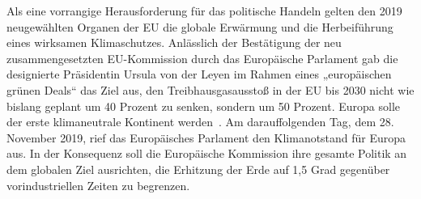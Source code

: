 Als eine vorrangige Herausforderung für das politische Handeln gelten den 2019 neugewählten Organen der EU die globale Erwärmung und die Herbeiführung eines wirksamen Klimaschutzes. Anlässlich der Bestätigung der neu zusammengesetzten EU-Kommission durch das Europäische Parlament gab die designierte Präsidentin Ursula von der Leyen im Rahmen eines „europäischen grünen Deals“ das Ziel aus, den Treibhausgasausstoß in der EU bis 2030 nicht wie bislang geplant um 40 Prozent zu senken, sondern um 50 Prozent. Europa solle der erste klimaneutrale Kontinent werden~\cite{tagesSpiegelEUKrise}. Am darauffolgenden Tag, dem 28. November 2019, rief das Europäisches Parlament den Klimanotstand für Europa aus. In der Konsequenz soll die Europäische Kommission ihre gesamte Politik an dem globalen Ziel ausrichten, die Erhitzung der Erde auf 1,5 Grad gegenüber vorindustriellen Zeiten zu begrenzen.